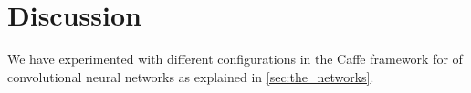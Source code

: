 \graphicspath{{Chapters/Project/}}

\section{Discussion} %
\label{sec:discussion}

We have experimented with different configurations in the Caffe framework for of convolutional neural
networks as explained in \autoref{sec:the_networks}.  
 


